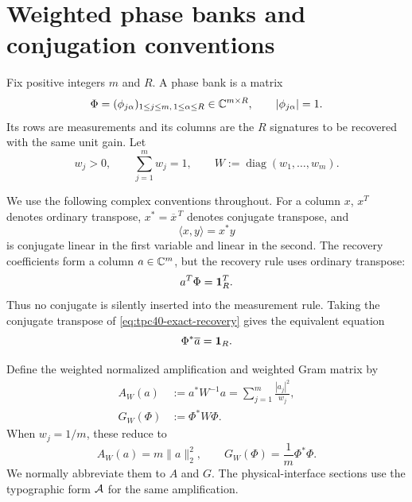\section{Weighted phase banks and conjugation conventions}
\label{sec:tpc40-weighted-banks}

Fix positive integers \(m\) and \(R\).  A phase bank is a matrix
\begin{equation}
 \Phi=(\phi_{j\alpha})_{1\le j\le m,\,1\le\alpha\le R}
 \in\mathbb C^{m\times R},
 \qquad |\phi_{j\alpha}|=1.
 \label{eq:tpc40-phase-bank}
\end{equation}
Its rows are measurements and its columns are the \(R\) signatures to be
recovered with the same unit gain.  Let
\begin{equation}
 w_j>0,
 \qquad \sum_{j=1}^{m}w_j=1,
 \qquad W:=\operatorname{diag}(w_1,\ldots,w_m).
 \label{eq:tpc40-row-weights}
\end{equation}

We use the following complex conventions throughout.  For a column \(x\),
\(x^T\) denotes ordinary transpose, \(x^*=\overline{x}^{\,T}\) denotes
conjugate transpose, and
\begin{equation}
 \langle x,y\rangle=x^*y
 \label{eq:tpc40-inner-product-convention}
\end{equation}
is conjugate linear in the first variable and linear in the second.  The
recovery coefficients form a column \(a\in\mathbb C^m\), but the recovery rule uses
ordinary transpose:
\begin{equation}
 a^T\Phi=\mathbf 1_R^T.
 \label{eq:tpc40-exact-recovery}
\end{equation}
Thus no conjugate is silently inserted into the measurement rule.  Taking
the conjugate transpose of \eqref{eq:tpc40-exact-recovery} gives the
equivalent equation
\begin{equation}
 \Phi^*\overline a=\mathbf 1_R.
 \label{eq:tpc40-exact-recovery-adjoint}
\end{equation}

Define the weighted normalized amplification and weighted Gram matrix by
\begin{align}
 A_W(a)
 &:=a^*W^{-1}a
   =\sum_{j=1}^{m}\frac{|a_j|^2}{w_j},
 \label{eq:tpc40-weighted-amplification}\\
 G_W(\Phi)
 &:=\Phi^*W\Phi.
 \label{eq:tpc40-weighted-Gram}
\end{align}
When \(w_j=1/m\), these reduce to
\begin{equation}
 A_W(a)=m\|a\|_2^2,
 \qquad
 G_W(\Phi)=\frac1m\Phi^*\Phi.
 \label{eq:tpc40-uniform-specialization}
\end{equation}
We normally abbreviate them to \(A\) and \(G\).  The physical-interface
sections use the typographic form \(\mathcal A\) for the same amplification.

